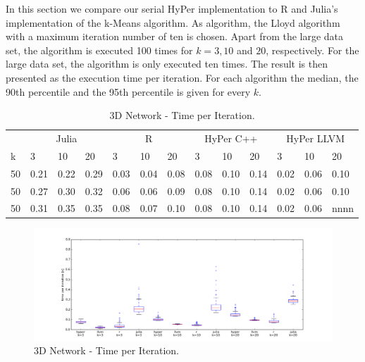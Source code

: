 In this section we compare our serial HyPer implementation to R and Julia’s implementation of the k-Means algorithm. As algorithm, the Lloyd algorithm with a maximum iteration number of ten is chosen. Apart from the large data set, the algorithm is executed 100 times for $k = 3, 10$ and $20$, respectively. For the large data set, the algorithm is only executed ten times. The result is then presented as the execution time per iteration. For each algorithm the median, the 90th percentile and the 95th percentile is given for every $k$. 
\\
\begin{table}[htsb]
  \caption[3D Network - Time per Iteration]{3D Network - Time per Iteration.}
  \label{tab:network_all}
  \centering
  \begin{tabular}{l l l l l l l l l l l l l}
    \toprule
      & \multicolumn{3}{c}{Julia} & \multicolumn{3}{c}{R} & \multicolumn{3}{c}{HyPer C++} & \multicolumn{3}{c}{HyPer LLVM}  \\
      k & 3 & 10 & 20 & 3 & 10 & 20 & 3 & 10 & 20 & 3 & 10 & 20 \\
    \midrule
      50  & 0.21 & 0.22 & 0.29 & 0.03 & 0.04 & 0.08 & 0.08 & 0.10 & 0.14 & 0.02 & 0.06 & 0.10 \\
      50  & 0.27 & 0.30 & 0.32 & 0.06 & 0.06 & 0.09 & 0.08 & 0.10 & 0.14 & 0.02 & 0.06 & 0.10 \\
      50  & 0.31 & 0.35 & 0.35 & 0.08 & 0.07 & 0.10 & 0.08 & 0.10 & 0.14 & 0.02 & 0.06 & nnnn \\
    \bottomrule
  \end{tabular}
\end{table}

\begin{figure}[htsb]
  \raggedleft
  \includegraphics[scale=0.4, trim="0cm 1cm 0cm 0cm"]{figures/charts/network_all}
  \caption[3D Network - Time per Iteration]{3D Network - Time per Iteration.}
  \label{fig:network_all}
\end{figure}

